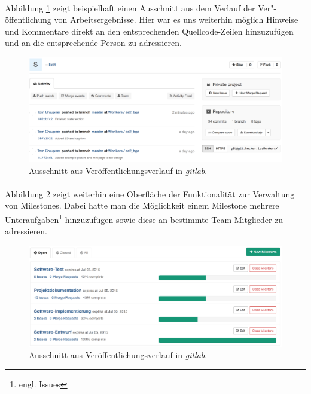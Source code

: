\paragraph{}Abbildung \ref{gl_commit} zeigt beispielhaft einen Ausschnitt aus dem Verlauf der Ver"-öffentlichung von Arbeitsergebnisse. Hier war es uns weiterhin möglich Hinweise und Kommentare direkt an den entsprechenden Quellcode-Zeilen hinzuzufügen und an die entsprechende Person zu adressieren.

\hspace*{1cm}
\begin{figure}[h!]
	\centering
	\includegraphics[width=\textwidth]{images/gl_commits.png}
	\caption{Ausschnitt aus Veröffentlichungsverlauf in \textit{gitlab}.}
	\label{gl_commit}
\end{figure}

\newpage
\paragraph{}Abbildung \ref{gl_milestone} zeigt weiterhin eine Oberfläche der Funktionalität zur Verwaltung von Milestones. Dabei hatte man die Möglichkeit einem Milestone mehrere Unteraufgaben\footnote{engl. Issues} hinzuzufügen sowie diese an bestimmte Team-Mitglieder zu adressieren.

\hspace*{1cm}
\begin{figure}[h!]
	\centering
	\includegraphics[width=\textwidth]{images/gl_milestones.png}
	\caption{Ausschnitt aus Veröffentlichungsverlauf in \textit{gitlab}.}
	\label{gl_milestone}
\end{figure}

